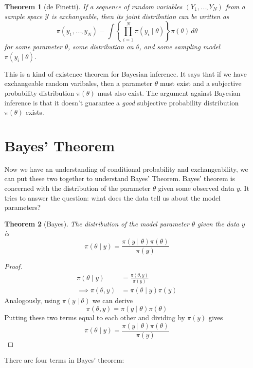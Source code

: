 \documentclass[
]{book}
\newtheorem{theorem}{Theorem}[chapter]
\theoremstyle{definition}
\theoremstyle{definition}
\theoremstyle{definition}
\theoremstyle{definition}
\theoremstyle{remark}
\begin{document}
\begin{theorem}[de Finetti]
If a sequence of random variables \((Y_1, \ldots, Y_N)\) from a sample space \(\mathcal{Y}\) is exchangeable, then its joint distribution can be written as
\[
\pi(y_1, \ldots, y_N) = \int \left\{\prod_{i=1}^N\pi(y_i \mid \theta)\right\} \pi(\theta)\, d\theta
\]
for some parameter \(\theta\), some distribution on \(\theta\), and some sampling model \(\pi(y_i \mid \theta)\).
\end{theorem}

This is a kind of existence theorem for Bayesian inference. It says that if we have exchangeable random varibales, then a parameter \(\theta\) must exist and a subjective probability distribution \(\pi(\theta)\) must also exist. The argument against Bayesian inference is that it doesn't guarantee a \emph{good} subjective probability distribution \(\pi(\theta)\) exists.

\hypertarget{bayes-theorem}{%
\section{Bayes' Theorem}\label{bayes-theorem}}

Now we have an understanding of conditional probability and exchangeability, we can put these two together to understand Bayes' Theorem. Bayes' theorem is concerned with the distribution of the parameter \(\theta\) given some observed data \(y\). It tries to answer the question: what does the data tell us about the model parameters?

\begin{theorem}[Bayes]
The distribution of the model parameter \(\theta\) given the data \(y\) is
\[
\pi(\theta \mid y) = \frac{\pi(y \mid \theta)\pi(\theta)}{\pi(y)}
\]
\end{theorem}

\begin{proof}
\begin{align}
\pi(\theta \mid y) &= \frac{\pi(\theta, y)}{\pi(y)}\\
\implies \pi(\theta, y) &= \pi(\theta \mid y)\pi(y)
\end{align}
Analogously, using \(\pi(y \mid \theta)\) we can derive
\[
\pi(\theta, y) = \pi(y \mid \theta)\pi(\theta)
\]
Putting these two terms equal to each other and dividing by \(\pi(y)\) gives
\[
\pi(\theta \mid y) = \frac{\pi(y \mid \theta)\pi(\theta)}{\pi(y)}
\]
\end{proof}

There are four terms in Bayes' theorem:
\end{document}
